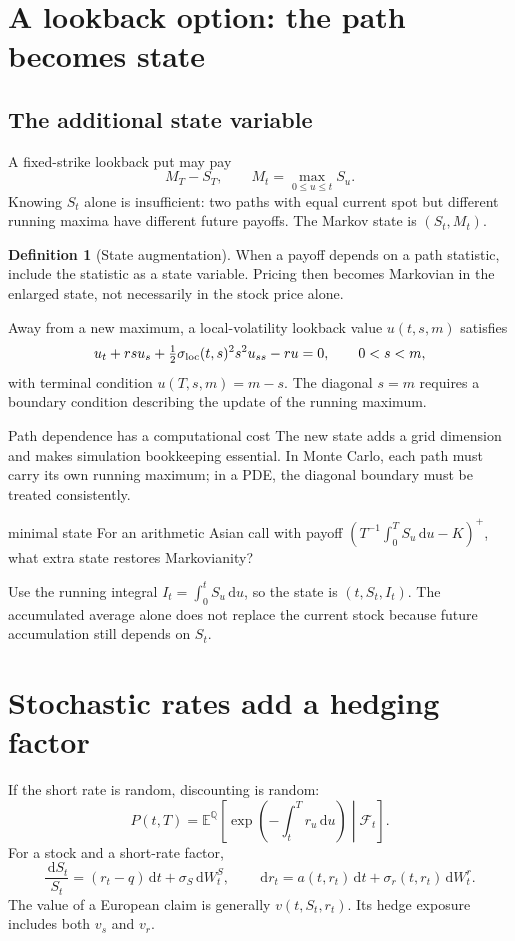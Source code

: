 \documentclass[10pt]{article}
\newcommand{\E}{\mathbb E}\newcommand{\Q}{\mathbb Q}\newcommand{\cF}{\mathcal F}
\newcommand{\dd}{\,\mathrm d}
\theoremstyle{definition}\newtheorem{definition}{Definition}[section]
\begin{document}
\section{A lookback option: the path becomes state}
\subsection{The additional state variable}
A fixed-strike lookback put may pay
\[
M_T-S_T,\qquad M_t=\max_{0\leq u\leq t}S_u.
\]
Knowing \(S_t\) alone is insufficient: two paths with equal current spot but
different running maxima have different future payoffs. The Markov state is
\((S_t,M_t)\).

\begin{definition}[State augmentation]
When a payoff depends on a path statistic, include the statistic as a state
variable. Pricing then becomes Markovian in the enlarged state, not
necessarily in the stock price alone.
\end{definition}

Away from a new maximum, a local-volatility lookback value \(u(t,s,m)\)
satisfies
\[
u_t+rsu_s+\tfrac12\sigma_{\rm loc}(t,s)^2s^2u_{ss}-ru=0,
\qquad 0<s<m,
\]
with terminal condition \(u(T,s,m)=m-s\). The diagonal \(s=m\) requires a
boundary condition describing the update of the running maximum.

\begin{keyidea}{Path dependence has a computational cost}
The new state adds a grid dimension and makes simulation bookkeeping
essential. In Monte Carlo, each path must carry its own running maximum;
in a PDE, the diagonal boundary must be treated consistently.
\end{keyidea}

\begin{studentexercise}{minimal state}
For an arithmetic Asian call with payoff
\((T^{-1}\int_0^T S_u\dd u-K)^+\), what extra state restores Markovianity?
\end{studentexercise}
\begin{shortsolution}
Use the running integral \(I_t=\int_0^tS_u\dd u\), so the state is
\((t,S_t,I_t)\). The accumulated average alone does not replace the current
stock because future accumulation still depends on \(S_t\).
\end{shortsolution}

\section{Stochastic rates add a hedging factor}
If the short rate is random, discounting is random:
\[
P(t,T)=\E^\Q\left[\exp\left(-\int_t^T r_u\dd u\right)\middle|\cF_t\right].
\]
For a stock and a short-rate factor,
\[
\frac{\dd S_t}{S_t}=(r_t-q)\dd t+\sigma_S\dd W_t^S,\qquad
\dd r_t=a(t,r_t)\dd t+\sigma_r(t,r_t)\dd W_t^r.
\]
The value of a European claim is generally \(v(t,S_t,r_t)\). Its hedge
exposure includes both \(v_s\) and \(v_r\).
\end{document}
